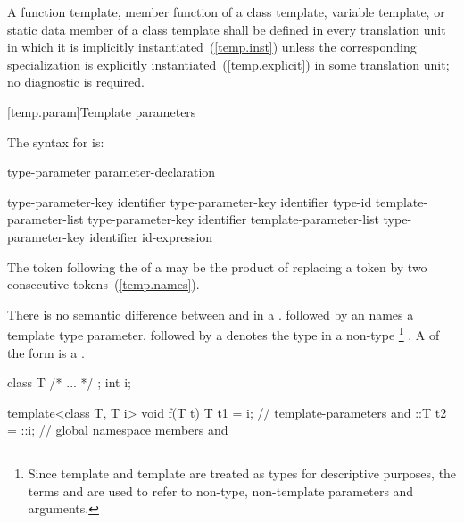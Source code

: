 \pnum
A function template, member function of a class template, variable template,
or static data
member of a class template shall be defined in every translation unit in
which it is implicitly instantiated~(\ref{temp.inst}) unless the
corresponding specialization is explicitly instantiated~(\ref{temp.explicit})
in some translation unit; no diagnostic is required.

[temp.param]{Template parameters}

\pnum
The syntax for
is:

\begin{bnf}
\br
  type-parameter\br
  parameter-declaration
\end{bnf}

\begin{bnf}
\br
  type-parameter-key \opt identifier\opt\br
  type-parameter-key identifier\opt \terminal{=} type-id\br
   template-parameter-list \terminal{>} type-parameter-key \opt identifier\opt\br
   template-parameter-list \terminal{>} type-parameter-key identifier\opt \terminal{=} id-expression
\end{bnf}

\begin{bnf}
\br
  \br
\end{bnf}

\enternote The \tcode{>} token following the
 of a
may be the product of replacing a
\tcode{>{>}} token by two consecutive \tcode{>}
tokens~(\ref{temp.names}).\exitnote

\pnum
There is no semantic difference between
and
in a
.
followed by an
names a template type parameter.
followed by a
denotes the type in a non-type%
\footnote{Since template
and template
are treated as types for descriptive purposes, the terms
and
are used to refer to non-type, non-template parameters and arguments.}
.
A  of the form
  is a .
\enterexample
\begin{codeblock}
  class T { /* ... */ };
  int i;

  template<class T, T i> void f(T t) {
    T t1 = i;      // template-parameters  and 
    ::T t2 = ::i;  // global namespace members  and 
  }
\end{codeblock}

